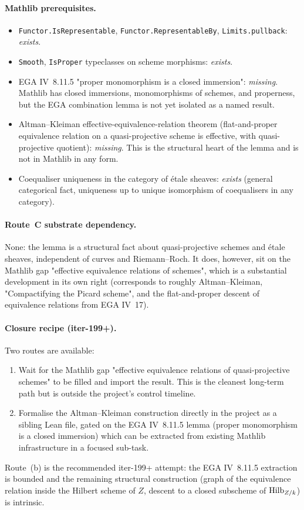\paragraph{Mathlib prerequisites.}
\begin{itemize}
  \item \texttt{Functor.IsRepresentable},
    \texttt{Functor.RepresentableBy}, \texttt{Limits.pullback}:
    \emph{exists}.
  \item \texttt{Smooth}, \texttt{IsProper} typeclasses on scheme
    morphisms: \emph{exists}.
  \item EGA IV~8.11.5 "proper monomorphism is a closed immersion":
    \emph{missing}. Mathlib has closed immersions, monomorphisms of
    schemes, and properness, but the EGA combination lemma is not yet
    isolated as a named result.
  \item Altman--Kleiman effective-equivalence-relation theorem
    (flat-and-proper equivalence relation on a quasi-projective
    scheme is effective, with quasi-projective quotient):
    \emph{missing}. This is the structural heart of the lemma and is
    not in Mathlib in any form.
  \item Coequaliser uniqueness in the category of \'etale sheaves:
    \emph{exists} (general categorical fact, uniqueness up to unique
    isomorphism of coequalisers in any category).
\end{itemize}

\paragraph{Route~C substrate dependency.} None: the lemma is a
structural fact about quasi-projective schemes and \'etale sheaves,
independent of curves and Riemann--Roch. It does, however, sit on the
Mathlib gap "effective equivalence relations of schemes", which is a
substantial development in its own right (corresponds to roughly
Altman--Kleiman, "Compactifying the Picard scheme", and the
flat-and-proper descent of equivalence relations from EGA IV~17).

\paragraph{Closure recipe (iter-199+).} Two routes are available:
\begin{enumerate}
  \item[(a)] Wait for the Mathlib gap "effective equivalence
    relations of quasi-projective schemes" to be filled and import
    the result. This is the cleanest long-term path but is outside
    the project's control timeline.
  \item[(b)] Formalise the Altman--Kleiman construction directly in
    the project as a sibling Lean file, gated on the EGA IV~8.11.5
    lemma (proper monomorphism is a closed immersion) which can be
    extracted from existing Mathlib infrastructure in a focused
    sub-task.
\end{enumerate}
Route~(b) is the recommended iter-199+ attempt: the EGA IV~8.11.5
extraction is bounded and the remaining structural construction
(graph of the equivalence relation inside the Hilbert scheme of $Z$,
descent to a closed subscheme of $\operatorname{Hilb}_{Z/k}$) is intrinsic.

